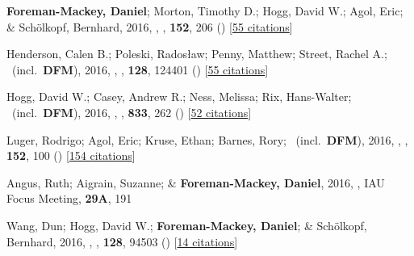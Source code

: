 \item[{\color{numcolor}\scriptsize24}] \textbf{Foreman-Mackey, Daniel}; Morton, Timothy D.; Hogg, David W.; Agol, Eric; \& Sch{\"o}lkopf, Bernhard, 2016, , \aj, \textbf{152}, 206 () [\href{https://ui.adsabs.harvard.edu/abs/2016AJ....152..206F}{55 citations}]

\item[{\color{numcolor}\scriptsize23}] Henderson, Calen B.; Poleski, Rados{\l}aw; Penny, Matthew; Street, Rachel A.; \etal\ (incl.\ \textbf{DFM}), 2016, , \pasp, \textbf{128}, 124401 () [\href{https://ui.adsabs.harvard.edu/abs/2016PASP..128l4401H}{55 citations}]

\item[{\color{numcolor}\scriptsize22}] Hogg, David W.; Casey, Andrew R.; Ness, Melissa; Rix, Hans-Walter; \etal\ (incl.\ \textbf{DFM}), 2016, , \apj, \textbf{833}, 262 () [\href{https://ui.adsabs.harvard.edu/abs/2016ApJ...833..262H}{52 citations}]

\item[{\color{numcolor}\scriptsize21}] Luger, Rodrigo; Agol, Eric; Kruse, Ethan; Barnes, Rory; \etal\ (incl.\ \textbf{DFM}), 2016, , \aj, \textbf{152}, 100 () [\href{https://ui.adsabs.harvard.edu/abs/2016AJ....152..100L}{154 citations}]

\item[{\color{numcolor}\scriptsize20}] Angus, Ruth; Aigrain, Suzanne; \& \textbf{Foreman-Mackey, Daniel}, 2016, , IAU Focus Meeting, \textbf{29A}, 191

\item[{\color{numcolor}\scriptsize19}] Wang, Dun; Hogg, David W.; \textbf{Foreman-Mackey, Daniel}; \& Sch{\"o}lkopf, Bernhard, 2016, , \pasp, \textbf{128}, 94503 () [\href{https://ui.adsabs.harvard.edu/abs/2016PASP..128i4503W}{14 citations}]

